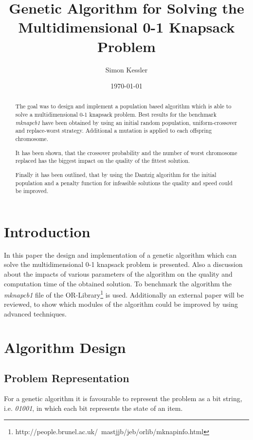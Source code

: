 \documentclass[a4paper]{article}
\title{Genetic Algorithm for Solving the Multidimensional 0-1 Knapsack Problem}
\author{Simon Kessler}
\date{\today}
\begin{document}
\maketitle

\begin{abstract}

The goal was to design and implement a population based algorithm which is able to solve a multidimensional 0-1 knapsack problem. Best results for the benchmark \emph{mknapcb1} have been obtained by using an initial random population, uniform-crossover and replace-worst strategy. Additional a mutation is applied to each offspring chromosome.

It has been shown, that the crossover probability and the number of worst chromosome replaced has the biggest impact on the quality of the fittest solution.

Finally it has been outlined, that by using the Dantzig algorithm for the initial population and a penalty function for infeasible solutions the quality and speed could be improved.
\end{abstract}

\section{Introduction}

In this paper the design and implementation of a genetic algorithm which can solve the multidimensional 0-1 knapsack problem is presented. Also a discussion about the impacts of various parameters of the algorithm on the quality and computation time of the obtained solution. To benchmark the algorithm the \emph{mknapcb1} file of the OR-Library\footnote{http://people.brunel.ac.uk/~mastjjb/jeb/orlib/mknapinfo.html} is used. Additionally an external paper will be reviewed, to show which modules of the algorithm could be improved by using advanced techniques.

\section{Algorithm Design}

\subsection{Problem Representation}

For a genetic algorithm it is favourable to represent the problem as a bit string, i.e. \emph{01001}, in which each bit represents the state of an item.
\end{document}
